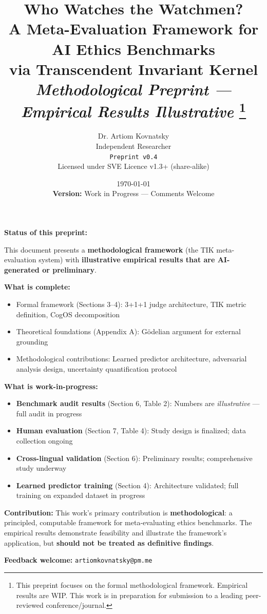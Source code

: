 \documentclass[11pt]{article}
\title{\vspace{-1cm}Who Watches the Watchmen? \\[0.3cm]
\large A Meta-Evaluation Framework for AI Ethics Benchmarks \\
via Transcendent Invariant Kernel \\[0.5cm]
\normalsize \textit{Methodological Preprint — Empirical Results Illustrative}
\thanks{This preprint focuses on the formal methodological framework. Empirical results are WIP. This work is in preparation for submission to a leading peer-reviewed conference/journal.}}
\author{
Dr. Artiom Kovnatsky \\
Independent Researcher \\
\texttt{Preprint v0.4} \\[0.2cm]
\small Licensed under SVE Licence v1.3+ (share-alike)
}
\date{\today \\ \vspace{0.3cm} \small \textbf{Version:} Work in Progress — Comments Welcome}
\begin{document}
\maketitle


\begin{wipbox}
\textbf{Status of this preprint:}

This document presents a \textbf{methodological framework} (the TIK meta-evaluation system) with \textbf{illustrative empirical results that are AI-generated or preliminary}.

\textbf{What is complete:}
\begin{itemize}
\item Formal framework (Sections 3--4): 3+1+1 judge architecture, TIK metric definition, CogOS decomposition
\item Theoretical foundations (Appendix A): Gödelian argument for external grounding
\item Methodological contributions: Learned predictor architecture, adversarial analysis design, uncertainty quantification protocol
\end{itemize}

\textbf{What is work-in-progress:}
\begin{itemize}
\item \textbf{Benchmark audit results} (Section 6, Table 2): Numbers are \textit{illustrative} — full audit in progress
\item \textbf{Human evaluation} (Section 7, Table 4): Study design is finalized; data collection ongoing
\item \textbf{Cross-lingual validation} (Section 6): Preliminary results; comprehensive study underway
\item \textbf{Learned predictor training} (Section 4): Architecture validated; full training on expanded dataset in progress
\end{itemize}

\textbf{Contribution:} This work's primary contribution is \textbf{methodological}: a principled, computable framework for meta-evaluating ethics benchmarks. The empirical results demonstrate feasibility and illustrate the framework's application, but \textbf{should not be treated as definitive findings}.

\textbf{Feedback welcome:} \texttt{artiomkovnatsky@pm.me}
\end{wipbox}
\end{document}
